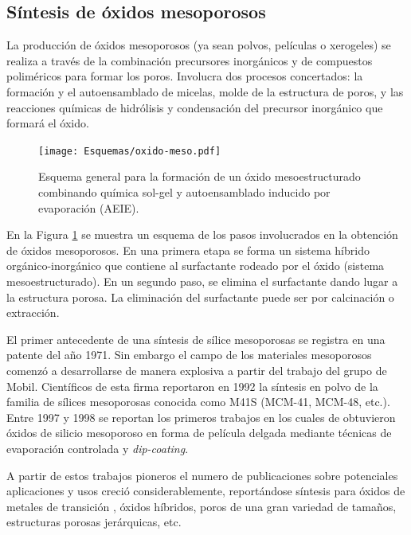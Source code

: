 	\subsection{Síntesis de óxidos mesoporosos} 

	 La producción de óxidos mesoporosos (ya sean polvos, películas o xerogeles) se realiza a través de la combinación precursores inorgánicos y de compuestos poliméricos para formar los poros. Involucra dos procesos concertados: la formación y el autoensamblado de micelas, molde de la estructura de poros, y las reacciones químicas de hidrólisis y condensación del precursor inorgánico que formará el óxido. 

				\begin{figure}[h!]
 				\begin{center}
 				\texttt{[image: Esquemas/oxido-meso.pdf]}
 				\caption[Esquema general para la formación de un óxido mesoestructurado]{Esquema general para la formación de un óxido mesoestructurado combinando química sol-gel y autoensamblado inducido por evaporación (AEIE).}
 		   		\label{fig:oxmeso}
 		    	\end{center}
 		    	\end{figure}

	 En la Figura \ref{fig:oxmeso} se muestra un esquema de los pasos involucrados en la obtención de óxidos mesoporosos. En una primera etapa se forma un sistema híbrido orgánico-inorgánico que contiene al surfactante rodeado por el óxido (sistema mesoestructurado). En un segundo paso, se elimina el surfactante dando lugar a la estructura porosa. La eliminación del surfactante puede ser por calcinación o extracción.
 

     El primer antecedente de una síntesis de sílice mesoporosas se registra en una patente del año 1971. Sin embargo el campo de los materiales mesoporosos comenzó a desarrollarse de manera explosiva a partir del trabajo del grupo de Mobil. Científicos de esta firma reportaron en 1992 la síntesis en polvo de la familia de sílices mesoporosas conocida como M41S (MCM-41, MCM-48, etc.). Entre 1997 y 1998 se reportan los primeros trabajos en los cuales de obtuvieron óxidos de silicio mesoporoso en forma de película delgada mediante técnicas de evaporación controlada y \textit{dip-coating}.\cite{Lu1997,Zhao1998a,Zhao1998,Brinker1999} 

     A partir de estos trabajos pioneros el numero de publicaciones sobre potenciales aplicaciones y usos creció considerablemente, reportándose síntesis para óxidos de metales de transición \cite{Ciesla1996,Ulagappan1996,Antonelli1995}, óxidos híbridos, poros de una gran variedad de tamaños, estructuras porosas jerárquicas, etc.\cite{Soler-Illia2006,Moller1998} %
   
